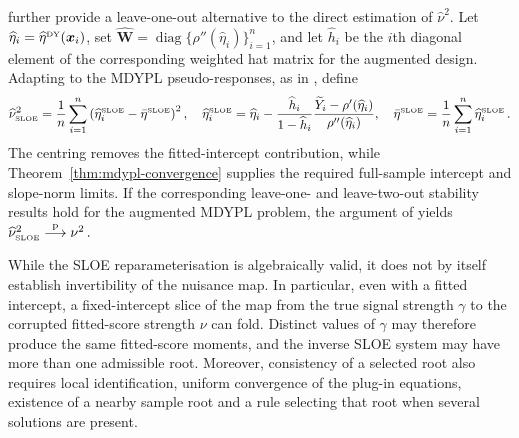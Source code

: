 \documentclass{article}
\theoremstyle{definition}
\newcommand*{\bb}{\boldsymbol}
\def\bx{\bb{x}}
\def\Ytil{\widetilde{Y}}
\begin{document}
\begin{bibunit}
\citet{yadlowsky+etal:2021} further provide a leave-one-out alternative to the direct estimation of
$\widehat\nu^2$. Let
$\widehat\eta_i=\widehat\eta^{\textrm{\tiny DY}}(\bx_i)$, set
$
    \widehat{\bb W}
    =
    \operatorname{diag}
    \{
        \rho''(\widehat\eta_i)
    \}_{i=1}^n
$,
and let $\widehat h_i$ be the $i$th diagonal element of the corresponding
weighted hat matrix for the augmented design. Adapting
\citet{yadlowsky+etal:2021} to the MDYPL pseudo-responses, as in
\citealt[equation~(11)]{sterzinger+kosmidis:2026}, define
$$
    \widehat\nu_{\textrm{\tiny SLOE}}^2
    =
    \frac1n
    \sum_{i=1}^n
    \left(
        \widehat\eta_i^{\textrm{\tiny SLOE}}
        -
        \bar\eta^{\textrm{\tiny SLOE}}
    \right)^2,
    \quad
    \widehat\eta_i^{\textrm{\tiny SLOE}}
    =
    \widehat\eta_i
    -
    \frac{\widehat h_i}{1-\widehat h_i}
    \frac{
        \Ytil_i-\rho'(\widehat\eta_i)
    }{
        \rho''(\widehat\eta_i)
    },
    \quad
    \bar\eta^{\textrm{\tiny SLOE}}
    =
    \frac1n
    \sum_{i=1}^n
    \widehat\eta_i^{\textrm{\tiny SLOE}} \,.
$$
The centring removes the fitted-intercept contribution, while
Theorem~\ref{thm:mdypl-convergence} supplies the required full-sample
intercept and slope-norm limits. If the corresponding leave-one- and
leave-two-out stability results hold for the augmented MDYPL problem, the
argument of \citet[Proposition~2]{yadlowsky+etal:2021} yields $\widehat\nu_{\textrm{\tiny SLOE}}^2 \overset{\mathrm p}{\longrightarrow} \nu^2 \,.$


While the SLOE reparameterisation is algebraically valid, it does not by itself
establish invertibility of the nuisance map. In particular, even with a fitted
intercept, a fixed-intercept slice of the map from the true signal strength
$\gamma$ to the corrupted fitted-score strength $\nu$ can fold. Distinct
values of $\gamma$ may therefore produce the same fitted-score moments, and
the inverse SLOE system may have more than one admissible root. 
Moreover, consistency of a selected root also
requires local identification, uniform convergence of the plug-in equations,
existence of a nearby sample root and a rule selecting that root when several
solutions are present. 



\end{bibunit}
\end{document}
